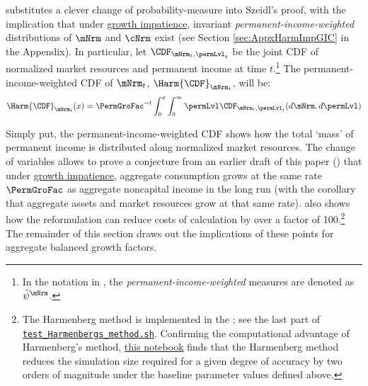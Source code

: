 \documentclass[\econtexRoot/BufferStockTheory]{subfiles}
\begin{document}
\cite{harmenbergInvariant} substitutes a clever change of probability-measure into Szeidl's proof, with the implication that under \hyperlink{GICRaw}{growth impatience}, invariant \emph{permanent-income-weighted} distributions of $\mNrm$ and $\cNrm$ exist (see Section \ref{sec:AppxHarmImpGIC} in the Appendix).
In particular, let $\CDF_{\mNrm_{t},\permLvl_{t}}$ be the joint CDF of normalized market resources and permanent income at time $t$.\footnote{In the notation in \cite{harmenbergInvariant}, the \emph{permanent-income-weighted} measures are denoted as $\tilde{\psi}^{\mNrm}$.} The permanent-income-weighted CDF of $\mNrm_{t}$, $\Harm{\CDF}_{\mNrm_{t}}$, will be:
%
\begin{equation}\label{eq:HarmCDF}
\Harm{\CDF}_{\mNrm_{t}}(x) = \PermGroFac^{-t}\int_{0}^{x}\int_{0}^{\infty} \permLvl\CDF_{\mNrm_{t},\permLvl_{t}}(d\mNrm,d\permLvl)
\end{equation}

Simply put, the permanent-income-weighted CDF shows how the total `mass' of permanent income is distributed along normalized market resources. The change of variables allows \cite{harmenbergInvariant} to prove a conjecture from an earlier draft of this paper (\cite{BufferStockTheoryQESubmit}) that under \hyperlink{GICRaw}{growth impatience}, aggregate consumption grows at the same rate $\PermGroFac$ as aggregate noncapital income in the long run (with the corollary that aggregate assets and market resources grow at that same rate).\hypertarget{test-Harmenbergs-method}{} \cite{harmenbergInvariant} also shows how the reformulation can reduce costs of calculation by over a factor of 100.\footnote{The Harmenberg method is implemented in the {\ARKurl}; see the last part of \href{https://github.com/econ-ark/BufferStockTheory/blob/master/Code/Python/test_Harmenbergs_method.sh}{\texttt{test\_Harmenbergs\_method.sh}}.
Confirming the computational advantage of Harmenberg's method, \href{https://econ-ark.org/materials/harmenberg-aggregation}{this notebook} finds that the Harmenberg method reduces the simulation size required for a given degree of accuracy by two orders of magnitude under the baseline parameter values defined above.} The remainder of this section draws out the implications of these points for aggregate balanced growth factors.




\end{document}
